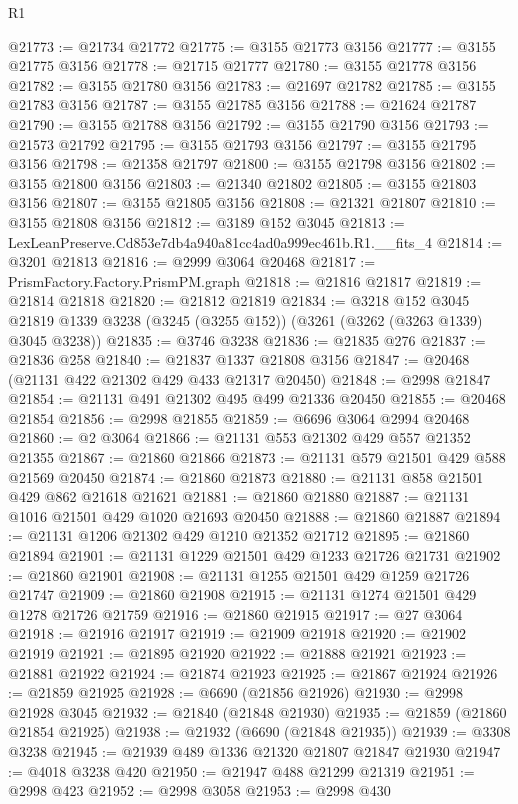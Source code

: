 \begin{lexlean}{R1}
\begin{coremodule}
@21773 := @21734 @21772
@21775 := @3155 @21773 @3156
@21777 := @3155 @21775 @3156
@21778 := @21715 @21777
@21780 := @3155 @21778 @3156
@21782 := @3155 @21780 @3156
@21783 := @21697 @21782
@21785 := @3155 @21783 @3156
@21787 := @3155 @21785 @3156
@21788 := @21624 @21787
@21790 := @3155 @21788 @3156
@21792 := @3155 @21790 @3156
@21793 := @21573 @21792
@21795 := @3155 @21793 @3156
@21797 := @3155 @21795 @3156
@21798 := @21358 @21797
@21800 := @3155 @21798 @3156
@21802 := @3155 @21800 @3156
@21803 := @21340 @21802
@21805 := @3155 @21803 @3156
@21807 := @3155 @21805 @3156
@21808 := @21321 @21807
@21810 := @3155 @21808 @3156
@21812 := @3189 @152 @3045
@21813 := LexLeanPreserve.Cd853e7db4a940a81cc4ad0a999ec461b.R1.__fits_4
@21814 := @3201 @21813
@21816 := @2999 @3064 @20468
@21817 := PrismFactory.Factory.PrismPM.graph
@21818 := @21816 @21817
@21819 := @21814 @21818
@21820 := @21812 @21819
@21834 := @3218
    @152
    @3045
    @21819
    @1339
    @3238
    (@3245 (@3255 @152))
    (@3261 (@3262 (@3263 @1339) @3045 @3238))
@21835 := @3746 @3238
@21836 := @21835 @276
@21837 := @21836 @258
@21840 := @21837 @1337 @21808 @3156
@21847 := @20468 (@21131 @422 @21302 @429 @433 @21317 @20450)
@21848 := @2998 @21847
@21854 := @21131 @491 @21302 @495 @499 @21336 @20450
@21855 := @20468 @21854
@21856 := @2998 @21855
@21859 := @6696 @3064 @2994 @20468
@21860 := @2 @3064
@21866 := @21131 @553 @21302 @429 @557 @21352 @21355
@21867 := @21860 @21866
@21873 := @21131 @579 @21501 @429 @588 @21569 @20450
@21874 := @21860 @21873
@21880 := @21131 @858 @21501 @429 @862 @21618 @21621
@21881 := @21860 @21880
@21887 := @21131 @1016 @21501 @429 @1020 @21693 @20450
@21888 := @21860 @21887
@21894 := @21131 @1206 @21302 @429 @1210 @21352 @21712
@21895 := @21860 @21894
@21901 := @21131 @1229 @21501 @429 @1233 @21726 @21731
@21902 := @21860 @21901
@21908 := @21131 @1255 @21501 @429 @1259 @21726 @21747
@21909 := @21860 @21908
@21915 := @21131 @1274 @21501 @429 @1278 @21726 @21759
@21916 := @21860 @21915
@21917 := @27 @3064
@21918 := @21916 @21917
@21919 := @21909 @21918
@21920 := @21902 @21919
@21921 := @21895 @21920
@21922 := @21888 @21921
@21923 := @21881 @21922
@21924 := @21874 @21923
@21925 := @21867 @21924
@21926 := @21859 @21925
@21928 := @6690 (@21856 @21926)
@21930 := @2998 @21928 @3045
@21932 := @21840 (@21848 @21930)
@21935 := @21859 (@21860 @21854 @21925)
@21938 := @21932 (@6690 (@21848 @21935))
@21939 := @3308 @3238
@21945 := @21939 @489 @1336 @21320 @21807 @21847 @21930
@21947 := @4018 @3238 @420
@21950 := @21947 @488 @21299 @21319
@21951 := @2998 @423
@21952 := @2998 @3058
@21953 := @2998 @430

\end{coremodule}
\end{lexlean}

